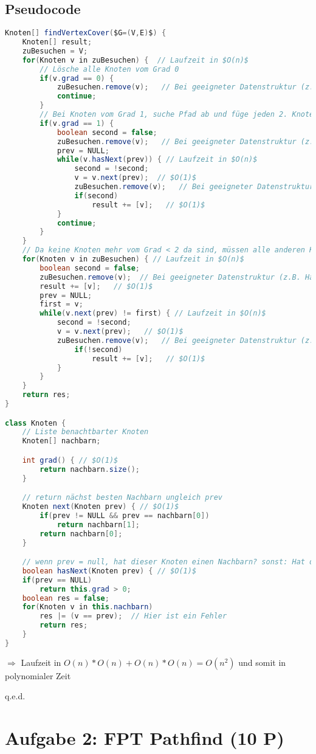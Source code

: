 \documentclass[a4paper,11pt,twoside]{scrartcl}
\newcommand{\qed}{%
	\begin{flushright}
		q.e.d.
	\end{flushright}%
	}
\begin{document}
\subsection{Pseudocode}
\begin{lstlisting}[language=Java]
Knoten[] findVertexCover($G=(V,E)$) {
	Knoten[] result;
	zuBesuchen = V;
	for(Knoten v in zuBesuchen) {  // Laufzeit in $O(n)$
		// Lösche alle Knoten vom Grad 0
		if(v.grad == 0) {
			zuBesuchen.remove(v);   // Bei geeigneter Datenstruktur (z.B. Hashing) $O(1)$
			continue;
		}
		// Bei Knoten vom Grad 1, suche Pfad ab und füge jeden 2. Knoten dem Ergebniss hinzu
		if(v.grad == 1) {
			boolean second = false;
			zuBesuchen.remove(v);   // Bei geeigneter Datenstruktur (z.B. Hashing) $O(1)$
			prev = NULL;
			while(v.hasNext(prev)) { // Laufzeit in $O(n)$
				second = !second;
				v = v.next(prev);  // $O(1)$
				zuBesuchen.remove(v);   // Bei geeigneter Datenstruktur (z.B. Hashing) $O(1)$
				if(second)
					result += [v];   // $O(1)$
			}
			continue;
		}
	} 
	// Da keine Knoten mehr vom Grad < 2 da sind, müssen alle anderen Knoten Zykel bilden
	for(Knoten v in zuBesuchen) { // Laufzeit in $O(n)$
		boolean second = false;
		zuBesuchen.remove(v);  // Bei geeigneter Datenstruktur (z.B. Hashing) $O(1)$
		result += [v];   // $O(1)$
		prev = NULL;
		first = v;
		while(v.next(prev) != first) { // Laufzeit in $O(n)$
			second = !second;
			v = v.next(prev);   // $O(1)$
			zuBesuchen.remove(v);   // Bei geeigneter Datenstruktur (z.B. Hashing) $O(1)$
				if(!second)
					result += [v];   // $O(1)$
			}
		}
	}
	return res;
}

class Knoten {
	// Liste benachtbarter Knoten
	Knoten[] nachbarn;

	int grad() { // $O(1)$
		return nachbarn.size();
	}

	// return nächst besten Nachbarn ungleich prev
	Knoten next(Knoten prev) { // $O(1)$
		if(prev != NULL && prev == nachbarn[0])
			return nachbarn[1];
		return nachbarn[0];
	}

	// wenn prev = null, hat dieser Knoten einen Nachbarn? sonst: Hat dieser Knoten einen Nachbarn ungleich prev?
	boolean hasNext(Knoten prev) { // $O(1)$
	if(prev == NULL)
		return this.grad > 0;
	boolean res = false;
	for(Knoten v in this.nachbarn)
		res |= (v == prev);  // Hier ist ein Fehler
		return res;
	}
}
\end{lstlisting}
$\Rightarrow$ Laufzeit in $O(n) * O(n) + O(n) * O(n) = O(n^2)$ und somit in polynomialer Zeit
\qed
\section{Aufgabe 2: FPT Pathfind (10 P)}
\end{document}
